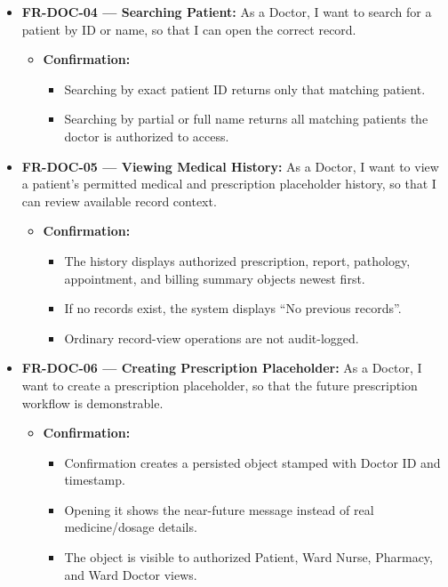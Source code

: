 \documentclass[11pt,a4paper]{article}
\begin{document}
\begin{itemize}
    \item \textbf{FR-DOC-04 — Searching Patient:} As a Doctor, I want to search for a patient by ID or name, so that I can open the correct record.
    \begin{itemize}
        \item \textbf{Confirmation:}
        \begin{itemize}
            \item Searching by exact patient ID returns only that matching patient.
            \item Searching by partial or full name returns all matching patients the doctor is authorized to access.
        \end{itemize}
    \end{itemize}

    \item \textbf{FR-DOC-05 — Viewing Medical History:} As a Doctor, I want to view a patient's permitted medical and prescription placeholder history, so that I can review available record context.
    \begin{itemize}
        \item \textbf{Confirmation:}
        \begin{itemize}
            \item The history displays authorized prescription, report, pathology, appointment, and billing summary objects newest first.
            \item If no records exist, the system displays ``No previous records''.
            \item Ordinary record-view operations are not audit-logged.
        \end{itemize}
    \end{itemize}

    \item \textbf{FR-DOC-06 — Creating Prescription Placeholder:} As a Doctor, I want to create a prescription placeholder, so that the future prescription workflow is demonstrable.
    \begin{itemize}
        \item \textbf{Confirmation:}
        \begin{itemize}
            \item Confirmation creates a persisted object stamped with Doctor ID and timestamp.
            \item Opening it shows the near-future message instead of real medicine/dosage details.
            \item The object is visible to authorized Patient, Ward Nurse, Pharmacy, and Ward Doctor views.
        \end{itemize}
    \end{itemize}


\end{itemize}
\end{document}
